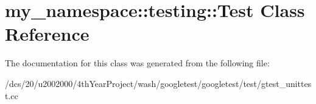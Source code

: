 \hypertarget{classmy__namespace_1_1testing_1_1Test}{}\section{my\+\_\+namespace\+:\+:testing\+:\+:Test Class Reference}
\label{classmy__namespace_1_1testing_1_1Test}


The documentation for this class was generated from the following file\+:\begin{DoxyCompactItemize}
\item 
/dcs/20/u2002000/4th\+Year\+Project/wash/googletest/googletest/test/gtest\+\_\+unittest.\+cc\end{DoxyCompactItemize}
